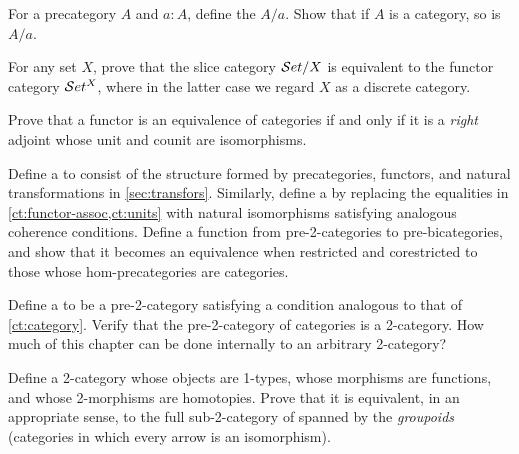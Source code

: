 \sectionExercises

\begin{ex}
  For a precategory $A$ and $a:A$, define the  $A/a$.
  Show that if $A$ is a category, so is $A/a$.
\end{ex}

\begin{ex}
  For any set $X$, prove that the slice category $\mathcal{S}et/X$ is equivalent to the functor category $\mathcal{S}et^X$, where in the latter case we regard $X$ as a discrete category.
\end{ex}

\begin{ex}
  Prove that a functor is an equivalence of categories if and only if it is a \emph{right} adjoint whose unit and counit are isomorphisms.
\end{ex}

\begin{ex}\label{ct:pre2cat}
  Define a  to consist of the structure formed by precategories, functors, and natural transformations in \autoref{sec:transfors}.
  Similarly, define a  by replacing the equalities in \autoref{ct:functor-assoc,ct:units} with natural isomorphisms satisfying analogous coherence conditions.
  Define a function from pre-2-categories to pre-bicategories, and show that it becomes an equivalence when restricted and corestricted to those whose hom-precategories are categories.
\end{ex}

\begin{ex}\label{ct:2cat}
  Define a  to be a pre-2-category satisfying a condition analogous to that of \autoref{ct:category}.
  Verify that the pre-2-category of categories \ucat is a 2-category.
  How much of this chapter can be done internally to an arbitrary 2-category?
\end{ex}

\begin{ex}\label{ct:groupoids}
  Define a 2-category whose objects are 1-types, whose morphisms are functions, and whose 2-morphisms are homotopies.
  Prove that it is equivalent, in an appropriate sense, to the full sub-2-category of \ucat spanned by the \emph{groupoids} (categories in which every arrow is an isomorphism).
\end{ex}

